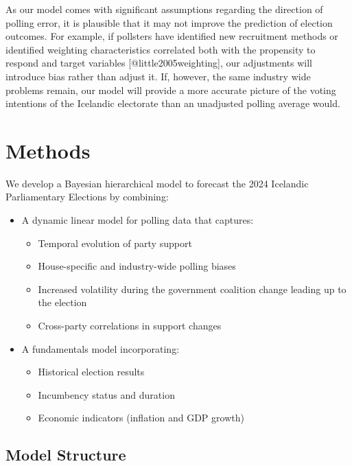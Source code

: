\documentclass[
  letterpaper,
  DIV=11,
  numbers=noendperiod]{scrartcl}
\providecommand{\tightlist}{%
  \setlength{\itemsep}{0pt}\setlength{\parskip}{0pt}}\usepackage{longtable,booktabs,array}
\begin{document}
As our model comes with significant assumptions regarding the direction
of polling error, it is plausible that it may not improve the prediction
of election outcomes. For example, if pollsters have identified new
recruitment methods or identified weighting characteristics correlated
both with the propensity to respond and target variables
{[}@little2005weighting{]}, our adjustments will introduce bias rather
than adjust it. If, however, the same industry wide problems remain, our
model will provide a more accurate picture of the voting intentions of
the Icelandic electorate than an unadjusted polling average would.

\section{Methods}\label{methods}

We develop a Bayesian hierarchical model to forecast the 2024 Icelandic
Parliamentary Elections by combining:

\begin{itemize}
\tightlist
\item
  A dynamic linear model for polling data that captures:

  \begin{itemize}
  \tightlist
  \item
    Temporal evolution of party support
  \item
    House-specific and industry-wide polling biases
  \item
    Increased volatility during the government coalition change leading
    up to the election
  \item
    Cross-party correlations in support changes
  \end{itemize}
\item
  A fundamentals model incorporating:

  \begin{itemize}
  \tightlist
  \item
    Historical election results
  \item
    Incumbency status and duration
  \item
    Economic indicators (inflation and GDP growth)
  \end{itemize}
\end{itemize}

\subsection{Model Structure}\label{model-structure}
\end{document}
